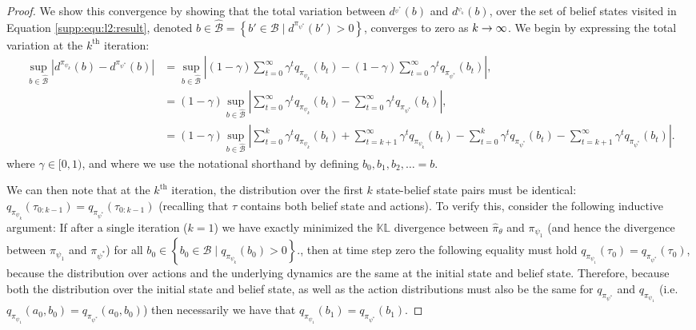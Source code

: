 \begin{proof}
    We show this convergence by showing that the total variation between $d^{_{\psi^*}}(b)$ and $d^{_{\psi_k}}(b)$, over the set of belief states visited in Equation \eqref{supp:equ:l2:result}, denoted $b \in \hat{\mathcal{B}} = \left\lbrace b' \in \mathcal{B} \mid d^{\pi_{\psi^*}}(b') > 0 \right\rbrace$, converges to zero as $k \rightarrow \infty$.  We begin by expressing the total variation at the $k^{\mathrm{th}}$ iteration:
    \begin{align}
        \sup_{b \in \hat{\mathcal{B}}} \left|d^{\pi_{\psi_k}}(b)-d^{\pi_{\psi^*}}(b)\right| &= \sup_{b \in \hat{\mathcal{B}}} \left|(1-\gamma) \sum_{t=0}^{\infty} \gamma^t q_{\pi_{\psi_k}}(b_t)-(1-\gamma) \sum_{t=0}^{\infty} \gamma^t q_{\pi_{\psi^*}}(b_t)\right|, \\
        &= (1-\gamma) \sup_{b \in \hat{\mathcal{B}}} \left| \sum_{t=0}^{\infty} \gamma^t q_{\pi_{\psi_k}}(b_t)- \sum_{t=0}^{\infty} \gamma^t q_{\pi_{\psi^*}}(b_t)\right|, \\
        &= (1-\gamma) \sup_{b \in \hat{\mathcal{B}}} \left| \sum_{t=0}^{k} \gamma^t q_{\pi_{\psi_k}}(b_t) + \sum_{t=k+1}^{\infty} \gamma^t q_{\pi_{\psi_k}}(b_t) - \sum_{t=0}^{k} \gamma^t q_{\pi_{\psi^*}}(b_t) - \sum_{t=k+1}^{\infty} \gamma^t q_{\pi_{\psi^*}}(b_t)\right| .
    \end{align}
    where $\gamma \in [0,1)$, and where we use the notational shorthand by defining $b_0, b_1, b_2, \ldots = b$.  
    
    We can then note that at the $k^{\mathrm{th}}$ iteration, the distribution over the first $k$ state-belief state pairs must be identical: $q_{\pi_{\psi_k}}(\tau_{0:k-1}) = q_{\pi_{\psi^*}}(\tau_{0:k-1})$ (recalling that $\tau$ contains both belief state and actions).  To verify this, consider the following inductive argument: If after a single iteration ($k=1$) we have exactly minimized the $\mathbb{KL}$ divergence between $\hat{\pi}_{\theta}$ and $\pi_{\psi_1}$ (and hence the divergence between $\pi_{\psi_1}$ and $\pi_{\psi^*}$) for all $b_0 \in \left\lbrace b_0 \in \mathcal{B} \mid q_{\pi_{\psi_k}}(b_0)>0 \right\rbrace$., then at time step zero the following equality must hold $q_{\pi_{\psi_1}}(\tau_0) = q_{\pi_{\psi^*}}(\tau_0)$, because the distribution over actions and the underlying dynamics are the same at the initial state and belief state. Therefore, because both the distribution over the initial state and belief state, as well as the action distributions must also be the same for $q_{\pi_{\psi^*}}$ and $q_{\pi_{\psi_1}}$ (i.e. $q_{\pi_{\psi_1}}(a_0,b_{0}) = q_{\pi_{\psi^*}}(a_{0},b_{0})$) then necessarily we have that $q_{\pi_{\psi_1}}(b_{1}) = q_{\pi_{\psi^*}}(b_{1})$.
    

\end{proof}
